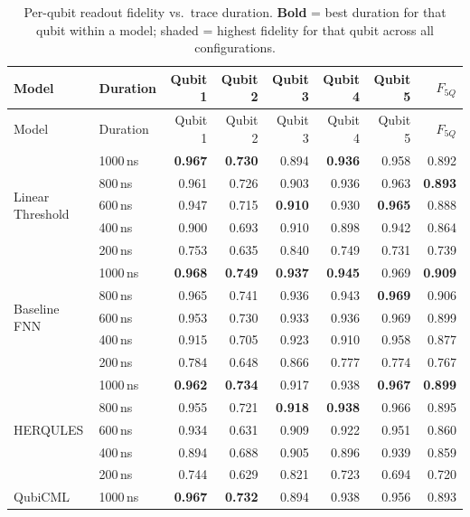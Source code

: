 \begin{longtable}{ll rrrrr r}
\caption{Per-qubit readout fidelity vs.\ trace duration. \textbf{Bold} = best duration for that qubit within a model; \colorbox{blue!12}{shaded} = highest fidelity for that qubit across all configurations.}\label{tab:fidelity}\\
\toprule
Model & Duration & Qubit 1 & Qubit 2 & Qubit 3 & Qubit 4 & Qubit 5 & $F_{5Q}$ \\
\midrule
\endfirsthead
\toprule
Model & Duration & Qubit 1 & Qubit 2 & Qubit 3 & Qubit 4 & Qubit 5 & $F_{5Q}$ \\
\midrule
\endhead
\multirow{5}{*}{Linear Threshold} & 1000\,ns & \textbf{0.967} & \textbf{0.730} & 0.894 & \textbf{0.936} & 0.958 & 0.892 \\
 & 800\,ns & 0.961 & 0.726 & 0.903 & 0.936 & 0.963 & \textbf{0.893} \\
 & 600\,ns & 0.947 & 0.715 & \textbf{0.910} & 0.930 & \textbf{0.965} & 0.888 \\
 & 400\,ns & 0.900 & 0.693 & 0.910 & 0.898 & 0.942 & 0.864 \\
 & 200\,ns & 0.753 & 0.635 & 0.840 & 0.749 & 0.731 & 0.739 \\
\midrule
\multirow{5}{*}{Baseline FNN} & 1000\,ns & \textbf{0.968} & \textbf{0.749} & \textbf{0.937} & \textbf{0.945} & 0.969 & \textbf{0.909} \\
 & 800\,ns & 0.965 & 0.741 & 0.936 & 0.943 & \textbf{0.969} & 0.906 \\
 & 600\,ns & 0.953 & 0.730 & 0.933 & 0.936 & 0.969 & 0.899 \\
 & 400\,ns & 0.915 & 0.705 & 0.923 & 0.910 & 0.958 & 0.877 \\
 & 200\,ns & 0.784 & 0.648 & 0.866 & 0.777 & 0.774 & 0.767 \\
\midrule
\multirow{5}{*}{HERQULES} & 1000\,ns & \textbf{0.962} & \textbf{0.734} & 0.917 & 0.938 & \textbf{0.967} & \textbf{0.899} \\
 & 800\,ns & 0.955 & 0.721 & \textbf{0.918} & \textbf{0.938} & 0.966 & 0.895 \\
 & 600\,ns & 0.934 & 0.631 & 0.909 & 0.922 & 0.951 & 0.860 \\
 & 400\,ns & 0.894 & 0.688 & 0.905 & 0.896 & 0.939 & 0.859 \\
 & 200\,ns & 0.744 & 0.629 & 0.821 & 0.723 & 0.694 & 0.720 \\
\midrule
\multirow{5}{*}{QubiCML} & 1000\,ns & \textbf{0.967} & \textbf{0.732} & 0.894 & 0.938 & 0.956 & 0.893 \\

\end{longtable}
